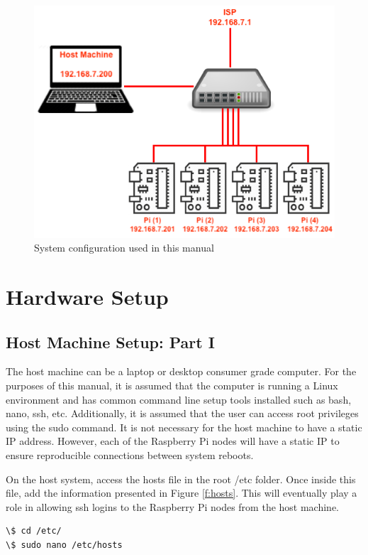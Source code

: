 \documentclass[sigconf]{acmart}
\begin{document}
\begin{figure}[!ht]
  \centering\includegraphics[width=\columnwidth]{images/system.png}
  \caption{System configuration used in this manual}\label{f:system}
\end{figure}

\section{Hardware Setup}
\subsection{Host Machine Setup: Part I}
The host machine can be a laptop or desktop consumer grade computer. For the purposes of this manual, it is assumed that the computer is running a Linux environment and has common command line setup tools installed such as bash, nano, ssh, etc. Additionally, it is assumed that the user can access root privileges using the sudo command. It is not necessary for the host machine to have a static IP address. However, each of the Raspberry Pi nodes will have a static IP to ensure reproducible connections between system reboots.

\setlength{\parskip}{1em}\noindent On the host system, access the hosts file in the root /etc folder. Once inside this file, add the information presented in Figure \ref{f:hosts}. This will eventually play a role in allowing ssh logins to the Raspberry Pi nodes from the host machine.

\begin{lstlisting}
\$ cd /etc/
\$ sudo nano /etc/hosts
\end{lstlisting}
\end{document}
